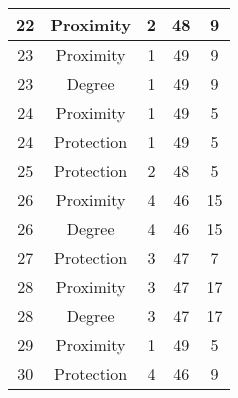 \documentclass[results.tex]{subfiles}
\begin{document}
\begin{center}
\begin{tabular}{| c || c | c | c | c |}
            \hline
            22                      & Proximity                    & 2                      & 48                      & 9                    \\
            \hline
            23                      & Proximity                    & 1                      & 49                      & 9                    \\
            \hline
            23                      & Degree                       & 1                      & 49                      & 9                    \\
            \hline
            24                      & Proximity                    & 1                      & 49                      & 5                    \\
            \hline
            24                      & Protection                   & 1                      & 49                      & 5                    \\
            \hline
            25                      & Protection                   & 2                      & 48                      & 5                    \\
            \hline
            26                      & Proximity                    & 4                      & 46                      & 15                   \\
            \hline
            26                      & Degree                       & 4                      & 46                      & 15                   \\
            \hline
            27                      & Protection                   & 3                      & 47                      & 7                    \\
            \hline
            28                      & Proximity                    & 3                      & 47                      & 17                   \\
            \hline
            28                      & Degree                       & 3                      & 47                      & 17                   \\
            \hline
            29                      & Proximity                    & 1                      & 49                      & 5                    \\
            \hline
            30                      & Protection                   & 4                      & 46                      & 9                    \\

\end{tabular}
\end{center}
\end{document}
